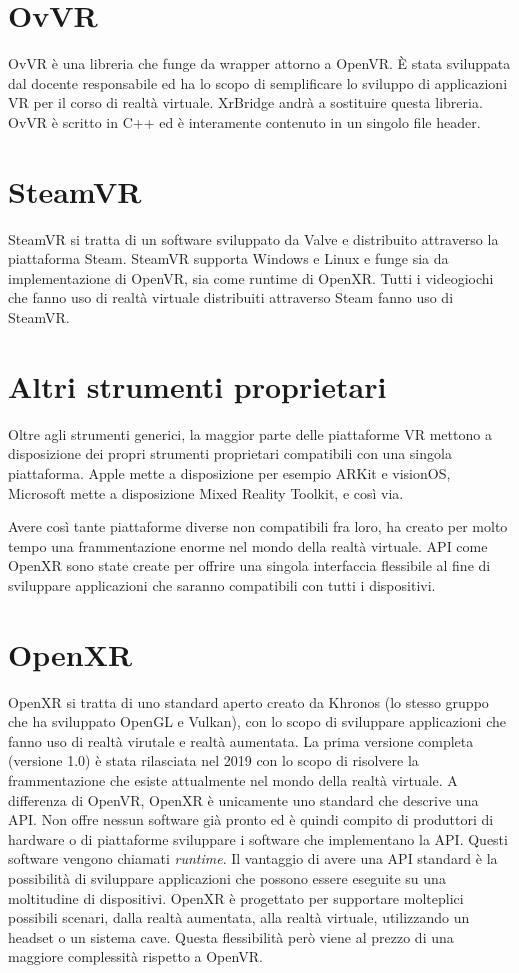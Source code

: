 \documentclass[twoside]{supsistudent}
\begin{document}
\section{OvVR}

OvVR è una libreria che funge da wrapper attorno a OpenVR. È stata sviluppata dal docente responsabile ed ha lo scopo di semplificare lo sviluppo di applicazioni VR per il corso di realtà virtuale. XrBridge andrà a sostituire questa libreria. OvVR è scritto in C++ ed è interamente contenuto in un singolo file header.

\section{SteamVR}

SteamVR si tratta di un software sviluppato da Valve e distribuito attraverso la piattaforma Steam. SteamVR supporta Windows e Linux e funge sia da implementazione di OpenVR, sia come runtime di OpenXR. Tutti i videogiochi che fanno uso di realtà virtuale distribuiti attraverso Steam fanno uso di SteamVR.

\section{Altri strumenti proprietari}

Oltre agli strumenti generici, la maggior parte delle piattaforme VR mettono a disposizione dei propri strumenti proprietari compatibili con una singola piattaforma. Apple mette a disposizione per esempio ARKit e visionOS, Microsoft mette a disposizione Mixed Reality Toolkit, e così via.

Avere così tante piattaforme diverse non compatibili fra loro, ha creato per molto tempo una frammentazione enorme nel mondo della realtà virtuale. API come OpenXR sono state create per offrire una singola interfaccia flessibile al fine di sviluppare applicazioni che saranno compatibili con tutti i dispositivi.

\section{OpenXR}

OpenXR si tratta di uno standard aperto creato da Khronos (lo stesso gruppo che ha sviluppato OpenGL e Vulkan), con lo scopo di sviluppare applicazioni che fanno uso di realtà virutale e realtà aumentata. La prima versione completa (versione 1.0) è stata rilasciata nel 2019 con lo scopo di risolvere la frammentazione che esiste attualmente nel mondo della realtà virtuale. A differenza di OpenVR, OpenXR è unicamente uno standard che descrive una API. Non offre nessun software già pronto ed è quindi compito di produttori di hardware o di piattaforme sviluppare i software che implementano la API. Questi software vengono chiamati \textit{runtime}. Il vantaggio di avere una API standard è la possibilità di sviluppare applicazioni che possono essere eseguite su una moltitudine di dispositivi. OpenXR è progettato per supportare molteplici possibili scenari, dalla realtà aumentata, alla realtà virtuale, utilizzando un headset o un sistema cave. Questa flessibilità però viene al prezzo di una maggiore complessità rispetto a OpenVR.
\end{document}
